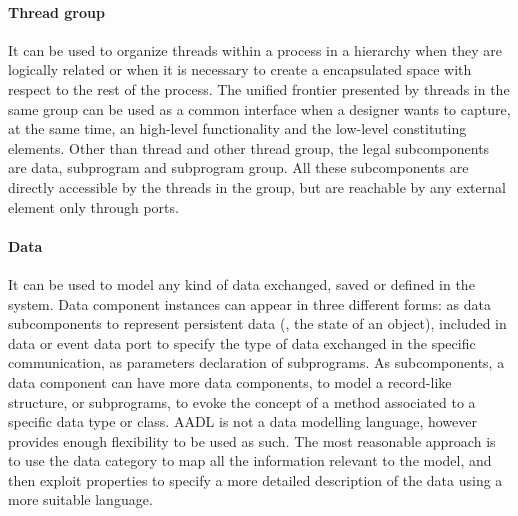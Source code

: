 \paragraph{Thread group} It can be used to organize threads within a process in a hierarchy when they are logically related or when it is necessary to create a encapsulated space with respect to the rest of the process. The unified frontier presented by threads in the same group can be used as a common interface when a designer wants to capture, at the same time, an high-level functionality and the low-level constituting elements. Other than thread and other thread group, the legal subcomponents are data, subprogram and subprogram group. All these subcomponents are directly accessible by the threads in the group, but are reachable by any external element only through ports.

\paragraph{Data} It can be used to model any kind of data exchanged, saved or defined in the system. Data component instances can appear in three different forms: as data subcomponents to represent persistent data (\eg, the state of an object), included in data or event data port to specify the type of data exchanged in the specific communication, as parameters declaration of subprograms. As subcomponents, a data component can have more data components, to model a record-like structure, or subprograms, to evoke the concept of a method associated to a specific data type or class. AADL is not a data modelling language, however provides enough flexibility to be used as such. The most reasonable approach is to use the data category to map all the information relevant to the model, and then exploit properties to specify a more detailed description of the data using a more suitable language.

